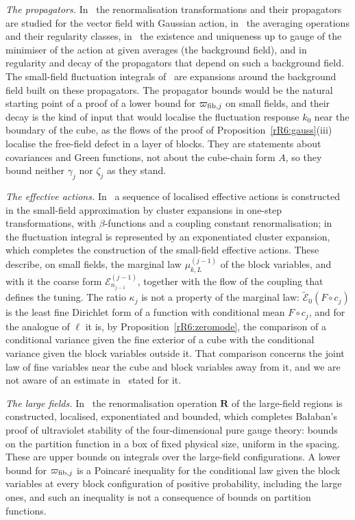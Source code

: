 \emph{The propagators.} In~\cite{Bal84a} the renormalisation transformations and their
propagators are studied for the vector field with Gaussian action, in~\cite{Bal85a} the averaging operations and their
regularity classes, in~\cite{Bal85c} the existence and uniqueness up to gauge of the minimiser
of the action at given averages (the background field), and
in~\cite{Bal85b} regularity and decay of the propagators that depend on
such a background field. The small-field fluctuation integrals
of~\cite{Bal87,Bal88} are expansions around the background field built on
these propagators. The propagator bounds would be the natural starting
point of a proof of a lower bound for $\varpi_{{\rm fib},j}$ on small
fields, and their decay is the kind of input that would localise the
fluctuation response $k_0$ near the boundary of the cube, as the flows of
the proof of Proposition~\ref{rR6:gauss}(iii) localise the free-field
defect in a layer of blocks. They are statements about covariances and
Green functions, not about the cube-chain form $A$, so they bound neither
$\gamma_j$ nor $\zeta_j$ as they stand.

\emph{The effective actions.} In~\cite{Bal87} a sequence of localised
effective actions is constructed in the small-field approximation by
cluster expansions in one-step transformations, with $\beta$-functions and
a coupling constant renormalisation; in~\cite{Bal88} the fluctuation
integral is represented by an exponentiated cluster expansion, which
completes the construction of the small-field effective actions. These describe, on small fields, the
marginal law $\mu^{(j-1)}_{k,L}$ of the block variables, and with it the
coarse form $\mathcal E^{(j-1)}_{n_{j-1}}$, together with the flow of the
coupling that defines the tuning. The ratio $\kappa_j$ is not a property of
the marginal law: $\tilde{\mathcal E}_0(F\circ c_j)$ is the least fine
Dirichlet form of a function with conditional mean $F\circ c_j$, and for
the analogue of $\ell$ it is, by Proposition~\ref{rR6:zeromode}, the
comparison of a conditional variance given the fine exterior of a cube with
the conditional variance given the block variables outside it. That
comparison concerns the joint law of fine variables near the cube and block
variables away from it, and we are not aware of an estimate
in~\cite{Bal87,Bal88} stated for it.

\emph{The large fields.} In~\cite{Bal89a,Bal89b} the renormalisation
operation $\mathbf R$ of the large-field regions is constructed, localised,
exponentiated and bounded, which completes Ba{\l}aban's proof of
ultraviolet stability of the four-dimensional pure gauge theory: bounds on
the partition function in a box of fixed physical size, uniform in the
spacing. These are upper bounds on integrals over the large-field
configurations. A lower bound for $\varpi_{{\rm fib},j}$ is a Poincar\'e
inequality for the conditional law given the block variables at every
block configuration of positive probability, including the large ones, and
such an inequality is not a consequence of bounds on partition functions.

